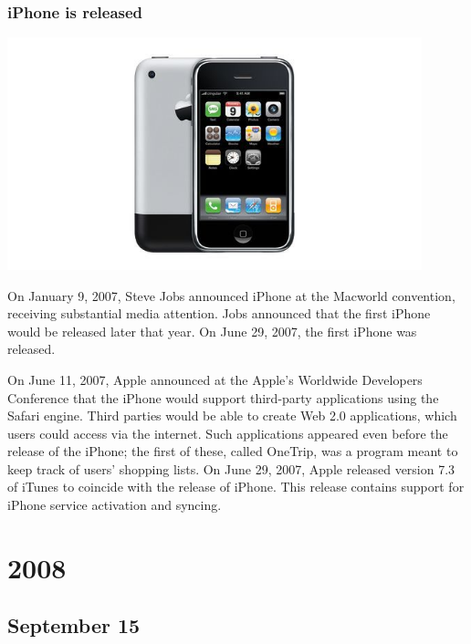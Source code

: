 \documentclass[11pt]{report}
\begin{document}
\subsection{iPhone is released}
\vspace{2mm}\begin{center}\includegraphics[width=12cm]{./img/iphone1.jpg}\end{center}
On January 9, 2007, Steve Jobs announced iPhone at the Macworld convention, receiving substantial media attention. Jobs announced that the first iPhone would be released later that year. On June 29, 2007, the first iPhone was released.

On June 11, 2007, Apple announced at the Apple's Worldwide Developers Conference that the iPhone would support third-party applications using the Safari engine. Third parties would be able to create Web 2.0 applications, which users could access via the internet. Such applications appeared even before the release of the iPhone; the first of these, called OneTrip, was a program meant to keep track of users' shopping lists. On June 29, 2007, Apple released version 7.3 of iTunes to coincide with the release of iPhone. This release contains support for iPhone service activation and syncing.

\chapter{2008}
\section{September 15}
\end{document}
